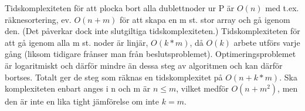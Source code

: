 \documentclass[a4paper,10pt,twoside]{article}
\begin{document}
Tidskomplexiteten för att plocka bort alla dublettnoder ur P är $O(n)$ med t.ex. räknesortering, ev. $O(n+m)$ för att skapa en m st. stor array och gå igenom den. (Det påverkar dock inte slutgiltiga tidskomplexiteten.) Tidskomplexiteten för att gå igenom alla m st. noder är linjär, $O(k*m)$, då $O(k)$ arbete utförs varje gång (liksom tidigare frånser man från beslutsproblemet). Optimeringsproblemet är logaritmiskt och därför mindre än dessa steg av algoritmen och kan därför bortses. Totalt ger de steg som räknas en tidskomplexitet på $O(n+k*m)$. Ska komplexiteten enbart anges i n och m är $n \le m$, vilket medför $O(n+m^2)$, men den är inte en lika tight jämförelse om inte $k = m$.
\end{document}
